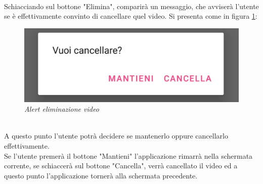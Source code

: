 \\Schiacciando sul bottone "Elimina", comparirà un messaggio, che avviserà l'utente se è effettivamente convinto di cancellare quel video. Si presenta come in figura \ref{fig:alertfoto}:
\begin{figure}[!h]
    \centering
	\includegraphics[scale=0.2]{Tesi/images/AlertFoto}
	\caption{\textit{Alert eliminazione video}}
	\label{fig:alertfoto}
\end{figure}
\\A questo punto l'utente potrà decidere se mantenerlo oppure cancellarlo effettivamente. 
\\Se l'utente premerà il bottone "Mantieni" l'applicazione rimarrà nella schermata corrente, se schiaccerà sul bottone "Cancella", verrà cancellato il video ed a questo punto l'applicazione tornerà alla schermata precedente.\pagebreak


